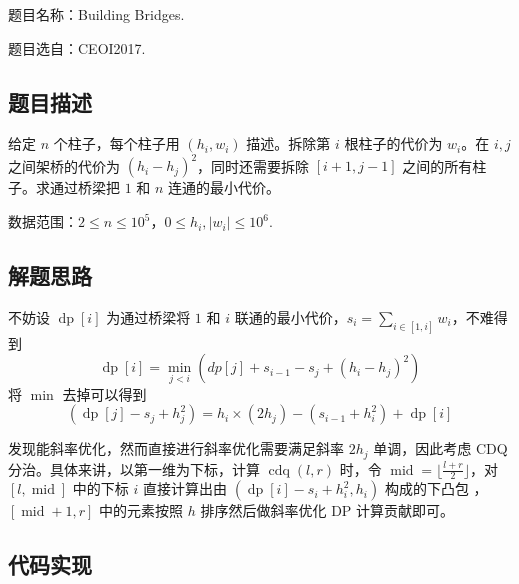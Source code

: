题目名称：Building Bridges.

题目选自：CEOI2017.

\subsection{题目描述}

给定 \(n\) 个柱子，每个柱子用 \((h_i,w_i)\) 描述。拆除第 \(i\)
根柱子的代价为 \(w_i\)。在 \(i,j\) 之间架桥的代价为
\((h_i-h_j)^2\)，同时还需要拆除 \([i+1,j-1]\)
之间的所有柱子。求通过桥梁把 \(1\) 和 \(n\) 连通的最小代价。

数据范围：\(2\leq n\leq 10^5\)，\(0\leq h_i,|w_i|\leq 10^6\).

\subsection{解题思路}

不妨设 \(\operatorname{dp}[i]\) 为通过桥梁将 \(1\) 和 \(i\)
联通的最小代价，\(s_i=\sum_{i\in[1,i]}w_i\)，不难得到 \[
\operatorname{dp}[i]=\min_{j < i}(dp[j]+s_{i-1}-s_j+(h_i-h_j)^2)
\] 将 \(\min\) 去掉可以得到 \[
(\operatorname{dp}[j]-s_j+h_j^2)=h_i\times(2h_j)-(s_{i-1}+h_i^2)+\operatorname{dp}[i]
\]

发现能斜率优化，然而直接进行斜率优化需要满足斜率 \(2h_j\) 单调，因此考虑
CDQ 分治。具体来讲，以第一维为下标，计算 \(\operatorname{cdq}(l,r)\)
时，令 \(\operatorname{mid}=\lfloor\frac{l+r}{2}\rfloor\)，对
\([l,\operatorname{mid}]\) 中的下标 \(i\) 直接计算出由
\((\operatorname{dp}[i]-s_i+h_i^2,h_i)\) 构成的下凸包
，\([\operatorname{mid}+1,r]\) 中的元素按照 \(h\) 排序然后做斜率优化 DP
计算贡献即可。

\subsection{代码实现}

\inputminted[frame=lines, numbers=left, fontsize=\footnotesize, tabsize=4, breaklines=true]{c++}{code/10.cpp}